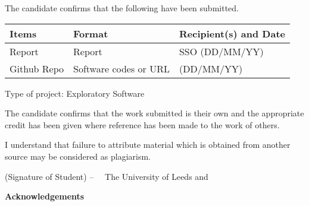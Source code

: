 \frontcover

\clearpage
\noindent The candidate confirms that the following have been submitted.

\begin{table}[ht!]
\begin{tabular}{|p{}|p{}|p{}|}
\hline 
Items & Format & Recipient(s) and Date \\ 
\hline 
Report & Report & SSO (DD/MM/YY) \\ 
\hline 
Github Repo & Software codes or URL & (DD/MM/YY) \\ 
\hline 
\end{tabular} 
\end{table}

\noindent Type of project: Exploratory Software
\vspace{\fill}

\noindent The candidate confirms that the work submitted is their own and the appropriate credit has been given where reference has been made to the work of others.
\vspace{\fill}

\noindent I understand that failure to attribute material which is obtained from another source may be considered as plagiarism.

\vspace{\fill}
\flushright(Signature of Student) -- \fullname
\flushleft
\vspace{\fill}
\textcopyright~\session~The University of Leeds and~\fullname

\begin{dissertationsummary}

\end{dissertationsummary}

\clearpage
\centering\textbf{Acknowledgements}
\flushleft


\tableofcontents


